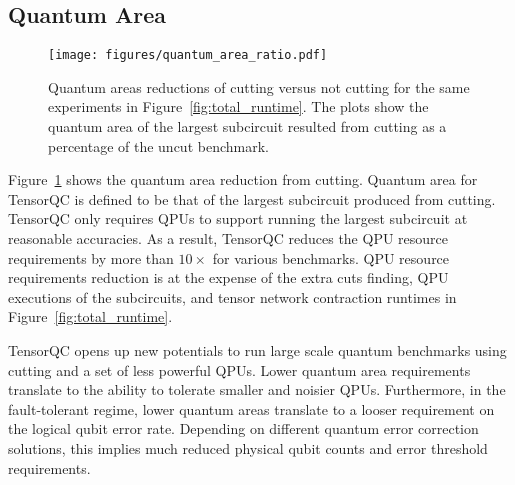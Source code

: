 \subsection{Quantum Area}
\begin{figure}[t]
    \centering
    \texttt{[image: figures/quantum\_area\_ratio.pdf]}
    \caption{Quantum areas reductions of cutting versus not cutting for the same experiments in Figure~\ref{fig:total_runtime}.
    The plots show the quantum area of the largest subcircuit resulted from cutting as a percentage of the uncut benchmark.}
    \label{fig:quantum_area}
\end{figure}

Figure~\ref{fig:quantum_area} shows the quantum area reduction from cutting.
Quantum area for TensorQC is defined to be that of the largest subcircuit produced from cutting.
TensorQC only requires QPUs to support running the largest subcircuit at reasonable accuracies.
As a result, TensorQC reduces the QPU resource requirements by more than $10\times$ for various benchmarks.
QPU resource requirements reduction is at the expense of the extra cuts finding,
QPU executions of the subcircuits,
and tensor network contraction runtimes in Figure~\ref{fig:total_runtime}.

TensorQC opens up new potentials to run large scale quantum benchmarks using cutting and a set of less powerful QPUs.
Lower quantum area requirements translate to the ability to tolerate smaller and noisier QPUs.
Furthermore, in the fault-tolerant regime,
lower quantum areas translate to a looser requirement on the logical qubit error rate.
Depending on different quantum error correction solutions,
this implies much reduced physical qubit counts and error threshold requirements.